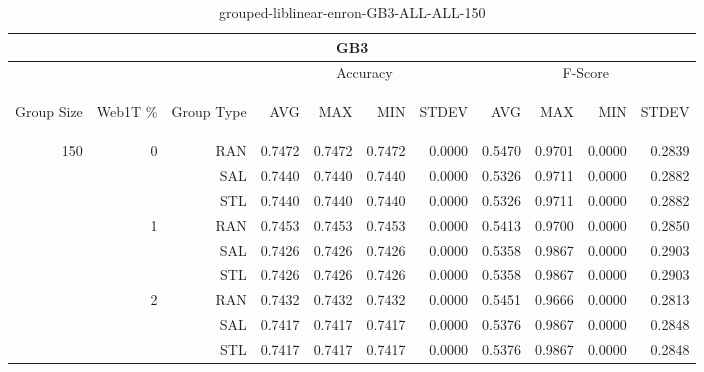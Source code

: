 \begin{center}
\begin{table}[htbp]
\begin{tabular}{ | r | r | r | r | r | r | r | r | r | r | r |}
\hline
\multicolumn{11}{|c|}{GB3}\\
\hline
 & & & \multicolumn{4}{|c|}{Accuracy} & \multicolumn{4}{|c|}{F-Score}\\ \cline{4-11}
\begin{sideways}Group Size\end{sideways} & \begin{sideways}Web1T \%\end{sideways} & \begin{sideways}Group Type\end{sideways} & \begin{sideways}AVG\end{sideways} & \begin{sideways}MAX\end{sideways} & \begin{sideways}MIN\end{sideways} & \begin{sideways}STDEV\end{sideways} & \begin{sideways}AVG\end{sideways} & \begin{sideways}MAX\end{sideways} & \begin{sideways}MIN\end{sideways} & \begin{sideways}STDEV\end{sideways}\\
\hline
\multirow{9}{*}{150}
 & \multirow{3}{*}{0} & RAN & 0.7472 & 0.7472 & 0.7472 & 0.0000 & 0.5470 & 0.9701 & 0.0000 & 0.2839\\ \cline{3-11}
 &   & SAL & 0.7440 & 0.7440 & 0.7440 & 0.0000 & 0.5326 & 0.9711 & 0.0000 & 0.2882\\ \cline{3-11}
 &   & STL & 0.7440 & 0.7440 & 0.7440 & 0.0000 & 0.5326 & 0.9711 & 0.0000 & 0.2882\\ \cline{2-11}
 & \multirow{3}{*}{1} & RAN & 0.7453 & 0.7453 & 0.7453 & 0.0000 & 0.5413 & 0.9700 & 0.0000 & 0.2850\\ \cline{3-11}
 &   & SAL & 0.7426 & 0.7426 & 0.7426 & 0.0000 & 0.5358 & 0.9867 & 0.0000 & 0.2903\\ \cline{3-11}
 &   & STL & 0.7426 & 0.7426 & 0.7426 & 0.0000 & 0.5358 & 0.9867 & 0.0000 & 0.2903\\ \cline{2-11}
 & \multirow{3}{*}{2} & RAN & 0.7432 & 0.7432 & 0.7432 & 0.0000 & 0.5451 & 0.9666 & 0.0000 & 0.2813\\ \cline{3-11}
 &   & SAL & 0.7417 & 0.7417 & 0.7417 & 0.0000 & 0.5376 & 0.9867 & 0.0000 & 0.2848\\ \cline{3-11}
 &   & STL & 0.7417 & 0.7417 & 0.7417 & 0.0000 & 0.5376 & 0.9867 & 0.0000 & 0.2848\\ \cline{2-11}
\hline
\end{tabular}
\caption{grouped-liblinear-enron-GB3-ALL-ALL-150}
\end{table}
\end{center}

